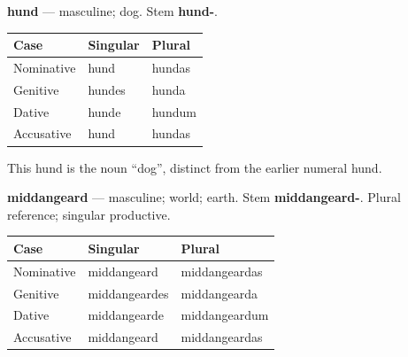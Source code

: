 \textbf{hund} — masculine; dog. Stem \textbf{hund-}.

\par\begingroup
\fontsize{10.5}{13.2}\selectfont
\setlength{\LTleft}{0pt}\setlength{\LTright}{\fill}
\noindent
\begin{tabular}{@{}>{\raggedright\arraybackslash}p{39.46mm}>{\raggedright\arraybackslash}p{39.46mm}>{\raggedright\arraybackslash}p{39.46mm}@{}}
\toprule
\textbf{Case} & \textbf{Singular} & \textbf{Plural} \\
\midrule
Nominative & hund & hundas \\
Genitive & hundes & hunda \\
Dative & hunde & hundum \\
Accusative & hund & hundas \\
\bottomrule
\end{tabular}
\par\endgroup

This hund is the noun “dog”, distinct from the earlier numeral hund.

\textbf{middangeard} — masculine; world; earth. Stem \textbf{middangeard-}. Plural reference; singular productive.

\par\begingroup
\fontsize{10.5}{13.2}\selectfont
\setlength{\LTleft}{0pt}\setlength{\LTright}{\fill}
\noindent
\begin{tabular}{@{}>{\raggedright\arraybackslash}p{32.88mm}>{\raggedright\arraybackslash}p{42.75mm}>{\raggedright\arraybackslash}p{42.75mm}@{}}
\toprule
\textbf{Case} & \textbf{Singular} & \textbf{Plural} \\
\midrule
Nominative & middangeard & middangeardas \\
Genitive & middangeardes & middangearda \\
Dative & middangearde & middangeardum \\
Accusative & middangeard & middangeardas \\
\bottomrule
\end{tabular}
\par\endgroup


